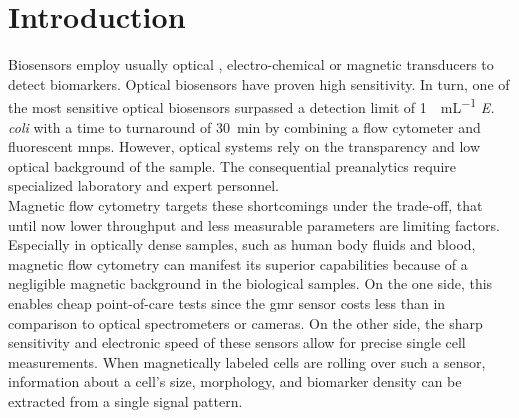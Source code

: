\chapter{Introduction}
Biosensors employ usually optical \cite{lit:bio:BioconjugateTechniques}, electro-chemical \cite{lit:fluidic:BindingPhysicsSurfaces} or magnetic \cite{lit:thes:reisbeck, lit:bio:MRCyte2016, lit:bio:NanoCytometer} transducers to detect biomarkers.  Optical  biosensors  have  proven high sensitivity.\cite{lit:Shapiro}  In turn, one of the  most  sensitive  optical  biosensors surpassed a detection limit of \SI{1}{\cfu\per\milli\liter} \textit{E. coli} with a time to turnaround of \SI{30}{\minute} by combining a flow  cytometer and fluorescent \glspl{mnp}.\cite{lit:flowCytometer} However, optical systems rely on the transparency and low optical background of the sample. The consequential preanalytics require specialized laboratory and expert personnel.\\
Magnetic flow cytometry targets these shortcomings under the trade-off, that until now lower throughput and less measurable parameters are limiting factors.\cite{lit:thes:reisbeck} Especially in optically dense samples, such as human body fluids and blood, magnetic flow cytometry can manifest its superior capabilities because of a negligible magnetic background in the biological samples.\cite{lit:bio:biochip:cd64} On the one side, this enables cheap point-of-care tests since the \gls{gmr} sensor costs less than  in comparison to optical spectrometers or cameras.\cite{lit:fluidic:HighFlowGMR,lit:bio:aflatoxinMNP,lit:bio:POC_CD64} On the other side, the sharp sensitivity and electronic speed of these sensors allow for precise single cell measurements.\cite{lit:bio:MRCyte2016,lit:fluidic:GMR_Quantification, lit:paperHelou} When magnetically labeled cells are rolling over such a sensor, information about a cell's size, morphology, and biomarker density can be extracted from a single signal pattern.\cite{lit:thes:michaelBauer} 

